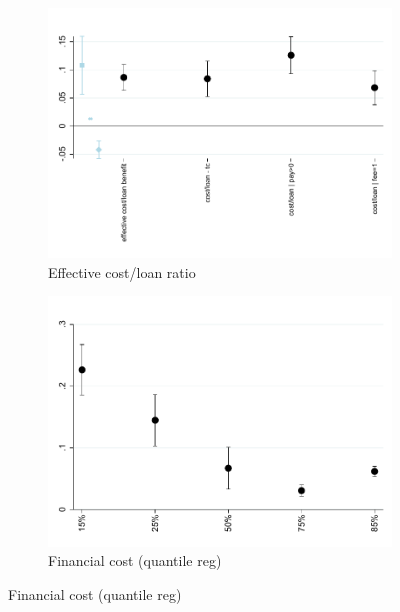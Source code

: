 \documentclass[oneside,11pt]{article}
\begin{document}
\begin{figure}[H]
    \caption{The effect of the fee-forcing treatment}
    \label{fc_pro2}
    \begin{center}
    \begin{subfigure}{0.42\textwidth}
        \caption{Effective cost/loan ratio}
        \centering
        \includegraphics[width=\textwidth]{Figuras/eff_te_pro_2.pdf}
    \end{subfigure}
        \begin{subfigure}{0.42\textwidth}
        \caption{Financial cost (quantile reg)}
        \centering
        \includegraphics[width=\textwidth]{Figuras/eff_quantile_pro_2.pdf}
    \end{subfigure}
    

\end{center}
\end{figure}
\end{document}
